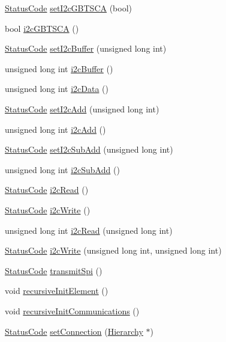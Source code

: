 \begin{DoxyCompactItemize}
\hyperlink{classStatusCode}{Status\+Code} \hyperlink{classFePGA_ac9a16de5f01fda901494abe61efb5029}{set\+I2c\+G\+B\+T\+S\+CA} (bool)
\item 
bool \hyperlink{classFePGA_a210cf57766c4f818ea61af671e91cfeb}{i2c\+G\+B\+T\+S\+CA} ()
\item 
\hyperlink{classStatusCode}{Status\+Code} \hyperlink{classFePGA_aaf52ed549f6b79d53f49c3f85c5fbad2}{set\+I2c\+Buffer} (unsigned long int)
\item 
unsigned long int \hyperlink{classFePGA_a5577463c8478cb6d54fc3c75b26cd819}{i2c\+Buffer} ()
\item 
unsigned long int \hyperlink{classFePGA_a9c261a09d323c07ec4b9e925d4dfc353}{i2c\+Data} ()
\item 
\hyperlink{classStatusCode}{Status\+Code} \hyperlink{classFePGA_a2da860f836e04ecc54056d0bf8cc8f98}{set\+I2c\+Add} (unsigned long int)
\item 
unsigned long int \hyperlink{classFePGA_a26b690b730b5f668ab28fb8deab8326b}{i2c\+Add} ()
\item 
\hyperlink{classStatusCode}{Status\+Code} \hyperlink{classFePGA_a37c1ee5bf89667c641f321479697166f}{set\+I2c\+Sub\+Add} (unsigned long int)
\item 
unsigned long int \hyperlink{classFePGA_ab51ac1c71e33f7444212de0e89e1f436}{i2c\+Sub\+Add} ()
\item 
\hyperlink{classStatusCode}{Status\+Code} \hyperlink{classFePGA_a939c5c23077210a2ad851a12694657a4}{i2c\+Read} ()
\item 
\hyperlink{classStatusCode}{Status\+Code} \hyperlink{classFePGA_a27b9c9bb486cea35b1bbcac5da96f527}{i2c\+Write} ()
\item 
unsigned long int \hyperlink{classFePGA_adf1c43786131d0f500b4662a877229c7}{i2c\+Read} (unsigned long int)
\item 
\hyperlink{classStatusCode}{Status\+Code} \hyperlink{classFePGA_a45e1cfdf1f303f3958bf6a83c4e8039b}{i2c\+Write} (unsigned long int, unsigned long int)
\item 
\hyperlink{classStatusCode}{Status\+Code} \hyperlink{classFePGA_ac7698a9f59f7290a6bb648030976597f}{transmit\+Spi} ()
\item 
void \hyperlink{classElement_a3c0abcb36f8906688bb7e32608df7086}{recursive\+Init\+Element} ()
\item 
void \hyperlink{classElement_a82119ed37dff76508a2746a853ec35ba}{recursive\+Init\+Communications} ()
\item 
\hyperlink{classStatusCode}{Status\+Code} \hyperlink{classElement_ab476b4b1df5954141ceb14f072433b89}{set\+Connection} (\hyperlink{classHierarchy}{Hierarchy} $\ast$)

\end{DoxyCompactItemize}
